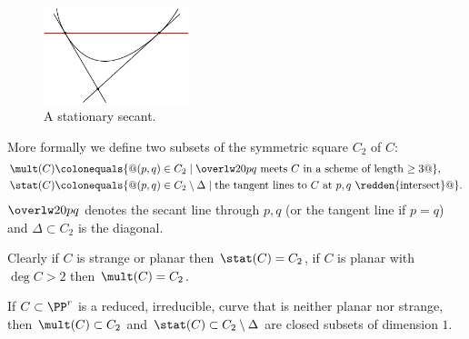 \begin{figure}
\vskip-3pt
\includegraphics[height=1.1in,angle=-20]{"main/Fig09-1"}
\vskip-22pt
\caption{A stationary secant.}
\label{Fig9.1}
\end{figure}

More formally we define two subsets of the symmetric square $C_2$ of $C$:
%
%
$$
\begin{aligned}
 \mult(C) &\colonequals \{@(p,q) \in C_2 \mid \overlw20{pq} \hbox{ meets
 $C$ in a scheme of length $\geq 3$}@\},\\
\stat(C) &\colonequals  \{@(p,q) \in C_2\setminus \Delta \mid  \hbox{the
tangent lines to $C$ at $p,q$ }
\redden{\hbox{intersect}}
@\}.
\end{aligned}
$$
$\overlw20{pq}$ 
denotes the secant line through $p,q$ (or the
tangent line if $p=q$) and $\Delta\subset C_2$
is the diagonal.

Clearly if $C$ is strange or planar then $\stat(C) = C_2$, 
if $C$ is
planar with $\deg C>2$ then $\mult(C) = C_2$.

\begin{proposition}\label{mult and stat}
 If $C\subset \PP^r$ is a reduced, irreducible, curve that is neither
 planar nor strange, then $\mult(C)\subset C_2$
 and $\stat(C)\subset C_2\setminus \Delta$ are closed subsets of dimension
 $1$.
\unif
\end{proposition}

